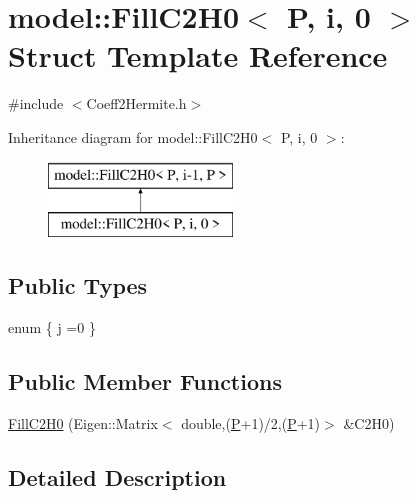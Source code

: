 \hypertarget{structmodel_1_1_fill_c2_h0_3_01_p_00_01i_00_010_01_4}{}\section{model\+:\+:Fill\+C2\+H0$<$ P, i, 0 $>$ Struct Template Reference}
\label{structmodel_1_1_fill_c2_h0_3_01_p_00_01i_00_010_01_4}


{\ttfamily \#include $<$Coeff2\+Hermite.\+h$>$}

Inheritance diagram for model\+:\+:Fill\+C2\+H0$<$ P, i, 0 $>$\+:\begin{figure}[H]
\begin{center}
\leavevmode
\includegraphics[height=2.000000cm]{structmodel_1_1_fill_c2_h0_3_01_p_00_01i_00_010_01_4}
\end{center}
\end{figure}
\subsection*{Public Types}
\begin{DoxyCompactItemize}
\item 
enum \{ \hyperlink{structmodel_1_1_fill_c2_h0_3_01_p_00_01i_00_010_01_4_a05b9c6963c4093568472a4fcdf4c8fb1aff1bb7489c1e539935fadc5a568743e4}{j} =0
 \}
\end{DoxyCompactItemize}
\subsection*{Public Member Functions}
\begin{DoxyCompactItemize}
\item 
\hyperlink{structmodel_1_1_fill_c2_h0_3_01_p_00_01i_00_010_01_4_a3b90905e3582299194efd8046509fb72}{Fill\+C2\+H0} (Eigen\+::\+Matrix$<$ double,(\hyperlink{_f_e_m_2linear__elasticity__3d_2tetgen_2generate_p_o_l_ycube_8m_a50a9afb44201a65ab7ad5feb2150aeb6}{P}+1)/2,(\hyperlink{_f_e_m_2linear__elasticity__3d_2tetgen_2generate_p_o_l_ycube_8m_a50a9afb44201a65ab7ad5feb2150aeb6}{P}+1)$>$ \&C2\+H0)
\end{DoxyCompactItemize}


\subsection{Detailed Description}
